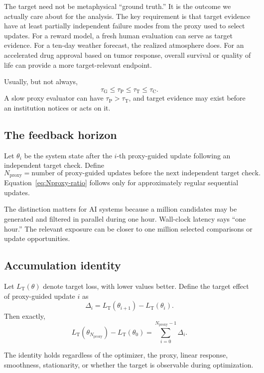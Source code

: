 \documentclass[11pt]{article}
\newcommand{\tauG}{\tau_{\mathrm{G}}}
\newcommand{\tauP}{\tau_{\mathrm{P}}}
\newcommand{\tauT}{\tau_{\mathrm{T}}}
\newcommand{\tauC}{\tau_{\mathrm{C}}}
\newcommand{\LT}{L_{\mathrm{T}}}
\newcommand{\Nproxy}{N_{\mathrm{proxy}}}
\begin{document}
The target need not be metaphysical ``ground truth.'' It is the outcome we actually care about for the analysis. The key requirement is that target evidence have at least partially independent failure modes from the proxy used to select updates. For a reward model, a fresh human evaluation can serve as target evidence. For a ten-day weather forecast, the realized atmosphere does. For an accelerated drug approval based on tumor response, overall survival or quality of life can provide a more target-relevant endpoint.

Usually, but not always,
\[
\tauG \leq \tauP \leq \tauT \leq \tauC.
\]
A slow proxy evaluator can have \(\tauP>\tauT\), and target evidence may exist before an institution notices or acts on it.

\subsection{The feedback horizon}

Let \(\theta_i\) be the system state after the \(i\)-th proxy-guided update following an independent target check. Define
\begin{equation}
\Nproxy =
\text{number of proxy-guided updates before the next independent target check}.
\end{equation}
Equation~\eqref{eq:Nproxy-ratio} follows only for approximately regular sequential updates.

The distinction matters for AI systems because a million candidates may be generated and filtered in parallel during one hour. Wall-clock latency says ``one hour.'' The relevant exposure can be closer to one million selected comparisons or update opportunities.

\subsection{Accumulation identity}

Let \(\LT(\theta)\) denote target loss, with lower values better. Define the target effect of proxy-guided update \(i\) as
\[
\Delta_i
=
\LT(\theta_{i+1})-\LT(\theta_i).
\]
Then exactly,
\begin{equation}
\boxed{
\LT(\theta_{\Nproxy})-\LT(\theta_0)
=
\sum_{i=0}^{\Nproxy-1}\Delta_i.
}
\label{eq:accumulation}
\end{equation}

The identity holds regardless of the optimizer, the proxy, linear response, smoothness, stationarity, or whether the target is observable during optimization.
\end{document}
